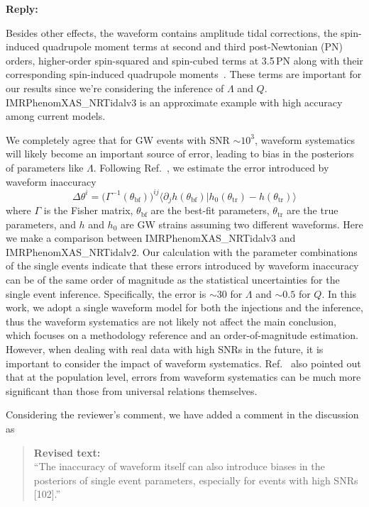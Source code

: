 \documentclass[11pt]{article}
\newenvironment{authorresponse}{
    \noindent \textbf{Reply:} \normalfont
}{
    \par\vspace{1.5em}
}
\newenvironment{revisedtext}{
    \begin{quote}
    \color{revcolor} \small \textbf{Revised text:} \\
}{
    \end{quote}
}
\begin{document}
\begin{authorresponse}
    Besides other effects, the waveform contains amplitude tidal corrections, the spin-induced quadrupole
    moment terms at second and third post-Newtonian (PN) orders, higher-order
    spin-squared and spin-cubed terms at 3.5\,PN along with their corresponding
    spin-induced quadrupole moments~\cite{Samajdar:2020xrd}. These 
    terms are important for our results since we're considering the inference of
    $\Lambda$ and $Q$. IMRPhenomXAS\_NRTidalv3 is an approximate example with high accuracy among current models.

    We completely agree that for GW events with SNR $\sim 10^3$, waveform systematics will likely become an important source of error, leading to bias in the posteriors of parameters like $\Lambda$. Following Ref.~\cite{Cutler:2007mi}, we estimate the error introduced by waveform inaccuracy
    \begin{equation}
        \Delta \theta^{i} = \big(\Gamma^{-1}(\theta_{\mathrm{bf}}) \big)^{ij} \Big\langle \partial_j h(\theta_{\mathrm{bf}}) \Big| h_0(\theta_{\mathrm{tr}}) - h(\theta_{\mathrm{tr}}) \Big\rangle
    \end{equation}
    where $\Gamma$ is the Fisher matrix, $\theta_{\mathrm{bf}}$ are the best-fit
    parameters, $\theta_{\mathrm{tr}}$ are the true parameters, and $h$ and $h_0$
    are GW strains assuming two different waveforms. Here we make a comparison between IMRPhenomXAS\_NRTidalv3
    and IMRPhenomXAS\_NRTidalv2. Our calculation with the
    parameter combinations of the single events indicate that these errors
    introduced by waveform inaccuracy can be of the same order of magnitude as
    the statistical uncertainties for the single event inference. Specifically,
    the error is $\sim 30$ for $\Lambda$ and $\sim 0.5$ for $Q$.
    In this work, we adopt a single waveform model for both the injections and
    the inference, thus the waveform systematics are not likely not
    affect the main conclusion, which focuses on a methodology
    reference and an order-of-magnitude estimation. However, when dealing with
    real data with high SNRs in the future, it is important to consider the impact of waveform systematics.
    Ref.~\cite{Williams:2026jqv} also pointed out that at the population level, errors from waveform systematics 
    can be much more significant than those from universal relations themselves.

    Considering the reviewer's comment, we have added a comment in the
    discussion as
    \begin{revisedtext}
        ``The inaccuracy of waveform itself can also introduce biases in the posteriors of single event parameters, especially for events with high SNRs [102].''
    \end{revisedtext}
\end{authorresponse}
\end{document}
